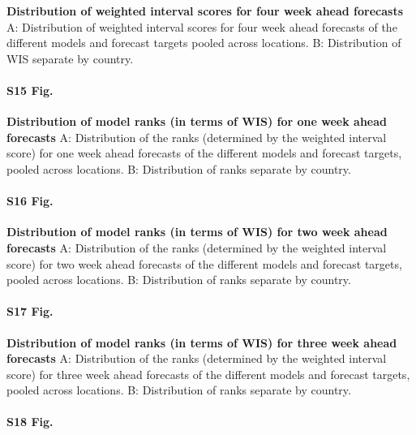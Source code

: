 \documentclass[10pt,letterpaper]{article}
\begin{document}
\textbf{Distribution of weighted interval scores for four week ahead forecasts}
A: Distribution of weighted interval scores for four week ahead
forecasts of the different models and forecast targets pooled across
locations. B: Distribution of WIS separate by country.

\paragraph{S15 Fig.}
\label{fig:distribution-scores-ranks-1}

\textbf{Distribution of model ranks (in terms of WIS) for one week ahead forecasts}
A: Distribution of the ranks (determined by the weighted interval score)
for one week ahead forecasts of the different models and forecast
targets, pooled across locations. B: Distribution of ranks separate by
country.

\paragraph{S16 Fig.}
\label{A: Distribution of the ranks (determined by the weighted interval score) for two week ahead forecasts of the different models and forecast targets, pooled across locations. B: Distribution of ranks separate by country.}

\textbf{Distribution of model ranks (in terms of WIS) for two week ahead forecasts}
A: Distribution of the ranks (determined by the weighted interval score)
for two week ahead forecasts of the different models and forecast
targets, pooled across locations. B: Distribution of ranks separate by
country.

\paragraph{S17 Fig.}
\label{A: Distribution of the ranks (determined by the weighted interval score) for three week ahead forecasts of the different models and forecast targets, pooled across locations. B: Distribution of ranks separate by country.}

\textbf{Distribution of model ranks (in terms of WIS) for three week ahead forecasts}
A: Distribution of the ranks (determined by the weighted interval score)
for three week ahead forecasts of the different models and forecast
targets, pooled across locations. B: Distribution of ranks separate by
country.

\paragraph{S18 Fig.}
\label{A: Distribution of the ranks (determined by the weighted interval score) for four week ahead forecasts of the different models and forecast targets, pooled across locations. B: Distribution of ranks separate by country.}
\end{document}
